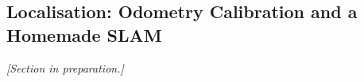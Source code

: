 \subsection{Localisation: Odometry Calibration and a Homemade SLAM}
\label{sec:slam}

\emph{[Section in preparation.]}
